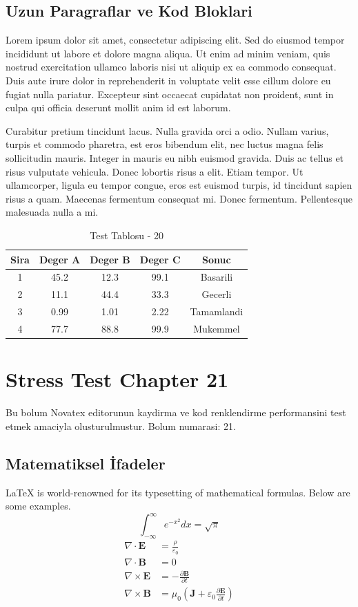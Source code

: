 \documentclass[12pt,a4paper]{article}
\begin{document}
\subsection{Uzun Paragraflar ve Kod Bloklari}
Lorem ipsum dolor sit amet, consectetur adipiscing elit. Sed do eiusmod tempor incididunt ut labore et dolore magna aliqua. Ut enim ad minim veniam, quis nostrud exercitation ullamco laboris nisi ut aliquip ex ea commodo consequat. Duis aute irure dolor in reprehenderit in voluptate velit esse cillum dolore eu fugiat nulla pariatur. Excepteur sint occaecat cupidatat non proident, sunt in culpa qui officia deserunt mollit anim id est laborum.

Curabitur pretium tincidunt lacus. Nulla gravida orci a odio. Nullam varius, turpis et commodo pharetra, est eros bibendum elit, nec luctus magna felis sollicitudin mauris. Integer in mauris eu nibh euismod gravida. Duis ac tellus et risus vulputate vehicula. Donec lobortis risus a elit. Etiam tempor. Ut ullamcorper, ligula eu tempor congue, eros est euismod turpis, id tincidunt sapien risus a quam. Maecenas fermentum consequat mi. Donec fermentum. Pellentesque malesuada nulla a mi.

\begin{table}[h!]
\centering
\begin{tabular}{|c|c|c|c|c|}
\hline
\textbf{Sira} & \textbf{Deger A} & \textbf{Deger B} & \textbf{Deger C} & \textbf{Sonuc} \\
\hline
1 & 45.2 & 12.3 & 99.1 & Basarili \\
2 & 11.1 & 44.4 & 33.3 & Gecerli \\
3 & 0.99 & 1.01 & 2.22 & Tamamlandi \\
4 & 77.7 & 88.8 & 99.9 & Mukemmel \\
\hline
\end{tabular}
\caption{Test Tablosu - 20}
\end{table}

\newpage
\section{Stress Test Chapter 21}
Bu bolum Novatex editorunun kaydirma ve kod renklendirme performansini test etmek amaciyla olusturulmustur. Bolum numarasi: 21.

\subsection{Matematiksel İfadeler}
\LaTeX{} is world-renowned for its typesetting of mathematical formulas. Below are some examples.
\begin{equation}
\int_{-\infty}^{\infty} e^{-x^2} dx = \sqrt{\pi}
\end{equation}
\begin{align}
\nabla \cdot \mathbf{E} &= \frac{\rho}{\varepsilon_0} \\
\nabla \cdot \mathbf{B} &= 0 \\
\nabla \times \mathbf{E} &= -\frac{\partial \mathbf{B}}{\partial t} \\
\nabla \times \mathbf{B} &= \mu_0\left(\mathbf{J} + \varepsilon_0 \frac{\partial \mathbf{E}}{\partial t}\right)
\end{align}
\end{document}
